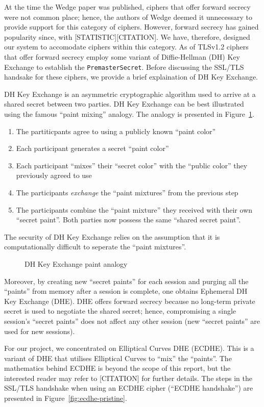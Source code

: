 \documentclass[../../main.tex]{subfiles}
\begin{document}
At the time the Wedge paper was published, ciphers that offer forward
secrecy were not common place; hence, the authors of Wedge deemed it
unnecessary to provide support for this category of ciphers. However,
forward secrecy has gained popularity since, with
[STATISTIC][CITATION]. We have, therefore, designed our system to
accomodate ciphers within this category. As of TLSv1.2 ciphers that
offer forward secrecy employ some variant of Diffie-Hellman (DH) Key
Exchange to establish the \texttt{PremasterSecret}. Before discussing
the SSL/TLS handsake for these ciphers, we provide a brief
explaination of DH Key Exchange.


DH Key Exchange is an asymmetric cryptographic algorithm used to
arrive at a shared secret between two parties. DH Key Exchange can be
best illustrated using the famous ``paint mixing'' analogy. The
analogy is presented in Figure~\ref{fig:paint}.
\begin{enumerate}
  \item The partiticpants agree to using a publicly known ``paint
    color''
  \item Each participant generates a secret ``paint color''
  \item Each participant ``mixes'' their ``secret color'' with the
    ``public color'' they previously agreed to use
  \item The participants \textit{exchange} the ``paint mixtures'' from
    the previous step
  \item The participants combine the ``paint mixture'' they received
    with their own ``secret paint''. Both parties now possess the same
    ``shared secret paint''.
\end{enumerate}
The security of DH Key Exchange relies on the assumption that it is
computationally difficult to seperate the ``paint mixtures''.
\begin{figure}[H]
  \centering
  
  \caption{DH Key Exchange paint analogy}
  \label{fig:paint}
\end{figure}
Moreover, by creating new ``secret paints'' for each session and
purging all the ``paints'' from memory after a session is complete,
one obtains Ephemeral DH Key Exchange (DHE). DHE offers forward
secrecy because no long-term private secret is used to negotiate the
shared secret; hence, compromising a single session's ``secret
paints'' does not affect any other session (new ``secret paints'' are
used for new sessions).

For our project, we concentrated on Elliptical Curves DHE (ECDHE).
This is a variant of DHE that utilises Elliptical Curves to ``mix''
the ``paints''. The mathematics behind ECDHE is beyond the scope of
this report, but the interested reader may refer to [CITATION] for
further details. The steps in the SSL/TLS handshake when using an
ECDHE cipher (``ECDHE handshake'') are presented in
Figure~\ref{fig:ecdhe-pristine}.
\end{document}
